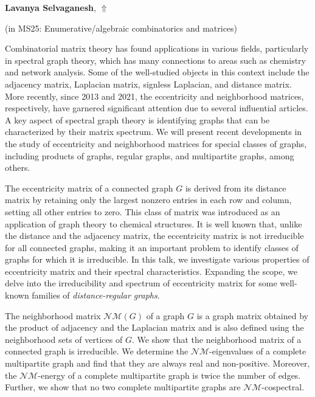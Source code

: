 \documentclass[ILAS2025-program.tex]{subfiles}
\begin{document}
     \hypertarget{down0226}{}\begin{ilasabstract}
    
    \textbf{Lavanya Selvaganesh},  \hfill \hyperlink{up0226}{$\Uparrow$}
    
    (in {\color{mstitle}MS25: Enumerative/algebraic combinatorics and matrices})
        
        \mtskip
    Combinatorial matrix theory has found applications in various fields, particularly in spectral graph theory, which has many connections to areas such as chemistry and network analysis. Some of the well-studied objects in this context include the adjacency matrix, Laplacian matrix, signless Laplacian, and distance matrix. More recently, since 2013 and 2021, the eccentricity and neighborhood matrices, respectively, have garnered significant attention due  to several influential articles. A key aspect of spectral graph theory is identifying graphs that can be characterized by their matrix spectrum. We will present recent developments in the study of eccentricity and neighborhood matrices for special classes of graphs, including products of graphs, regular graphs, and multipartite graphs, among others. 

The eccentricity matrix of a connected graph $G$ is derived from its distance matrix by retaining only the largest nonzero entries in each row and column, setting all other entries to zero. This class of matrix was introduced as an application of graph theory to chemical structures.  It is well known that, unlike the distance and the adjacency matrix, the eccentricity matrix is not irreducible for all connected graphs, making it an important problem to identify classes of graphs for which it is irreducible. In this talk, we  investigate various properties of eccentricity matrix and their spectral characteristics. Expanding the scope, we delve into the irreducibility and spectrum of eccentricity matrix for some well-known families of \textit{distance-regular graphs}. 

The neighborhood matrix $\mathcal{NM}(G)$ of a graph $G$ is a graph matrix obtained by the product of adjacency and the Laplacian matrix and is also defined using the neighborhood sets of vertices of $G$. We show that the neighborhood matrix of a connected graph is irreducible.  We determine the $\mathcal{NM}$-eigenvalues of a complete multipartite graph and find that they are always real and non-positive. Moreover, the $\mathcal{NM}$-energy of a complete multipartite graph is twice the number of edges. Further, we show that no two complete multipartite graphs are $\mathcal{NM}$-cospectral.
\end{ilasabstract}
\end{document}
